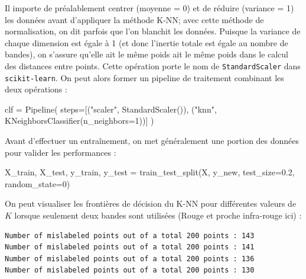 \documentclass[
  11pt,
  letterpaper,
  open=any,
  twoside=false,
  french]{scrbook}
\newenvironment{Shaded}{\begin{snugshade}}{\end{snugshade}}
\newcommand{\DecValTok}[1]{\textcolor[rgb]{0.68,0.00,0.00}{#1}}
\newcommand{\FloatTok}[1]{\textcolor[rgb]{0.68,0.00,0.00}{#1}}
\newcommand{\NormalTok}[1]{\textcolor[rgb]{0.00,0.23,0.31}{#1}}
\newcommand{\OperatorTok}[1]{\textcolor[rgb]{0.37,0.37,0.37}{#1}}
\newcommand{\StringTok}[1]{\textcolor[rgb]{0.13,0.47,0.30}{#1}}
\begin{document}
Il importe de préalablement centrer (moyenne = 0) et de réduire
(variance = 1) les données avant d'appliquer la méthode K-NN; avec cette
méthode de normalisation, on dit parfois que l'on blanchit les données.
Puisque la variance de chaque dimension est égale à 1 (et donc l'inertie
totale est égale au nombre de bandes), on s'assure qu'elle ait le même
poids ait le même poids dans le calcul des distances entre points. Cette
opération porte le nom de \texttt{StandardScaler} dans
\texttt{scikit-learn}. On peut alors former un pipeline de traitement
combinant les deux opérations :

\begin{Shaded}
\begin{Highlighting}[]
\NormalTok{clf }\OperatorTok{=}\NormalTok{ Pipeline(}
\NormalTok{    steps}\OperatorTok{=}\NormalTok{[(}\StringTok{"scaler"}\NormalTok{, StandardScaler()), (}\StringTok{"knn"}\NormalTok{, KNeighborsClassifier(n\_neighbors}\OperatorTok{=}\DecValTok{1}\NormalTok{))]}
\NormalTok{)}
\end{Highlighting}
\end{Shaded}

Avant d'effectuer un entraînement, on met généralement une portion des
données pour valider les performances :

\begin{Shaded}
\begin{Highlighting}[]
\NormalTok{X\_train, X\_test, y\_train, y\_test }\OperatorTok{=}\NormalTok{ train\_test\_split(X, y\_new, test\_size}\OperatorTok{=}\FloatTok{0.2}\NormalTok{, random\_state}\OperatorTok{=}\DecValTok{0}\NormalTok{)}
\end{Highlighting}
\end{Shaded}

On peut visualiser les frontières de décision du K-NN pour différentes
valeurs de \(K\) lorsque seulement deux bandes sont utilisées (Rouge et
proche infra-rouge ici) :

\begin{verbatim}
Number of mislabeled points out of a total 200 points : 143
Number of mislabeled points out of a total 200 points : 141
Number of mislabeled points out of a total 200 points : 136
Number of mislabeled points out of a total 200 points : 130
\end{verbatim}
\end{document}
